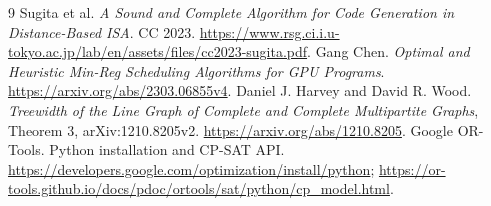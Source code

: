 \documentclass[UTF8,11pt,a4paper]{ctexart}
\begin{document}
\begin{thebibliography}{9}
 Sugita et al. \emph{A Sound and Complete Algorithm for Code Generation in Distance-Based ISA}. CC 2023. \url{https://www.rsg.ci.i.u-tokyo.ac.jp/lab/en/assets/files/cc2023-sugita.pdf}.
 Gang Chen. \emph{Optimal and Heuristic Min-Reg Scheduling Algorithms for GPU Programs}. \url{https://arxiv.org/abs/2303.06855v4}.
 Daniel J. Harvey and David R. Wood. \emph{Treewidth of the Line Graph of Complete and Complete Multipartite Graphs}, Theorem 3, arXiv:1210.8205v2. \url{https://arxiv.org/abs/1210.8205}.
 Google OR-Tools. Python installation and CP-SAT API. \url{https://developers.google.com/optimization/install/python}; \url{https://or-tools.github.io/docs/pdoc/ortools/sat/python/cp_model.html}.
\end{thebibliography}
\end{document}
